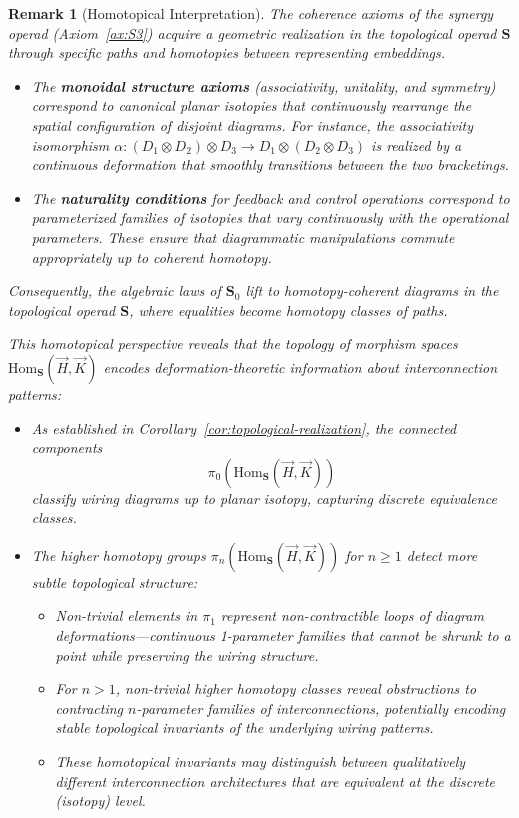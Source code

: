 \documentclass[11pt]{article}
\newtheorem{remark}{Remark}
\begin{document}
\begin{remark}[Homotopical Interpretation]\label{rem:homotopical-interpretation}
The coherence axioms of the synergy operad (Axiom~\ref{ax:S3}) acquire a geometric realization in the topological operad $\mathbf{S}$ through specific paths and homotopies between representing embeddings.

\begin{itemize}
    \item The \textbf{monoidal structure axioms} (associativity, unitality, and symmetry) correspond to canonical \emph{planar isotopies} that continuously rearrange the spatial configuration of disjoint diagrams. For instance, the associativity isomorphism $\alpha: (D_1 \otimes D_2) \otimes D_3 \to D_1 \otimes (D_2 \otimes D_3)$ is realized by a continuous deformation that smoothly transitions between the two bracketings.
    
    \item The \textbf{naturality conditions} for feedback and control operations correspond to parameterized families of isotopies that vary continuously with the operational parameters. These ensure that diagrammatic manipulations commute appropriately up to coherent homotopy.
\end{itemize}

Consequently, the algebraic laws of $\mathbf{S}_0$ lift to \emph{homotopy-coherent} diagrams in the topological operad $\mathbf{S}$, where equalities become homotopy classes of paths.

This homotopical perspective reveals that the topology of morphism spaces $\mathrm{Hom}_{\mathbf{S}}(\vec{H}, \vec{K})$ encodes deformation-theoretic information about interconnection patterns:

\begin{itemize}
    \item As established in Corollary~\ref{cor:topological-realization}, the connected components
    \[
    \pi_0\left(\mathrm{Hom}_{\mathbf{S}}(\vec{H}, \vec{K})\right)
    \]
    classify wiring diagrams up to planar isotopy, capturing discrete equivalence classes.
    
    \item The higher homotopy groups $\pi_n\left(\mathrm{Hom}_{\mathbf{S}}(\vec{H}, \vec{K})\right)$ for $n \geq 1$ detect more subtle topological structure:
    \begin{itemize}
        \item Non-trivial elements in $\pi_1$ represent \emph{non-contractible loops} of diagram deformations—continuous 1-parameter families that cannot be shrunk to a point while preserving the wiring structure.
        \item For $n > 1$, non-trivial higher homotopy classes reveal \emph{obstructions to contracting} $n$-parameter families of interconnections, potentially encoding stable topological invariants of the underlying wiring patterns.
        \item These homotopical invariants may distinguish between qualitatively different interconnection architectures that are equivalent at the discrete (isotopy) level.
    \end{itemize}
\end{itemize}


\end{remark}
\end{document}
